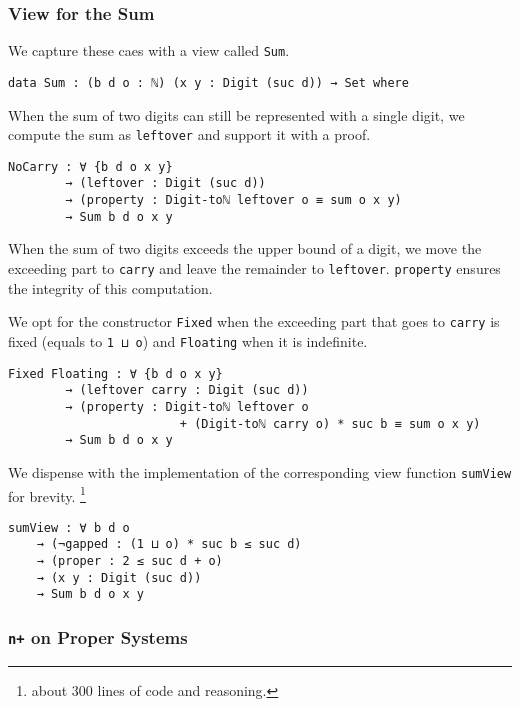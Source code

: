 \documentclass[\main/thesis.tex]{subfiles}
\begin{document}
\subsubsection{View for the Sum}

We capture these caes with a view called \lstinline|Sum|.

\begin{lstlisting}[basicstyle=\ttfamily\scriptsize]
data Sum : (b d o : ℕ) (x y : Digit (suc d)) → Set where
\end{lstlisting}

When the sum of two digits can still be represented with a single digit,
we compute the sum as \lstinline|leftover| and support it with a proof.

\begin{lstlisting}[basicstyle=\ttfamily\scriptsize]
    NoCarry : ∀ {b d o x y}
        → (leftover : Digit (suc d))
        → (property : Digit-toℕ leftover o ≡ sum o x y)
        → Sum b d o x y
\end{lstlisting}

When the sum of two digits exceeds the upper bound of a digit,
we move the exceeding part to \lstinline|carry| and leave the remainder to
\lstinline|leftover|. \lstinline|property| ensures the integrity of this
computation.

We opt for the constructor \lstinline|Fixed| when the exceeding part that goes
to \lstinline|carry| is fixed (equals to \lstinline|1 ⊔ o|) and
\lstinline|Floating| when it is indefinite.

\begin{lstlisting}[basicstyle=\ttfamily\scriptsize]
    Fixed Floating : ∀ {b d o x y}
        → (leftover carry : Digit (suc d))
        → (property : Digit-toℕ leftover o
                        + (Digit-toℕ carry o) * suc b ≡ sum o x y)
        → Sum b d o x y
\end{lstlisting}

We dispense with the implementation of the corresponding view function
\lstinline|sumView| for brevity.
\footnote{about 300 lines of code and reasoning.}

\begin{lstlisting}
sumView : ∀ b d o
    → (¬gapped : (1 ⊔ o) * suc b ≤ suc d)
    → (proper : 2 ≤ suc d + o)
    → (x y : Digit (suc d))
    → Sum b d o x y
\end{lstlisting}

\subsubsection{\lstinline|n+| on Proper Systems}
\end{document}

